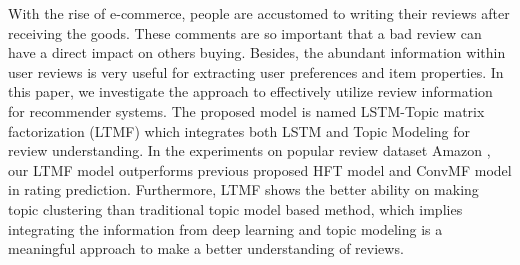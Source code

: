 With the rise of e-commerce, people are accustomed to writing their reviews after receiving the goods. These comments are so important that a bad review can have a direct impact on others buying. Besides, the abundant information within user reviews is very useful for extracting user preferences and item properties. In this paper, we investigate the approach to effectively utilize review information for recommender systems. The proposed model is named LSTM-Topic matrix factorization (LTMF) which integrates both LSTM and Topic Modeling for review understanding. In the experiments on popular review dataset Amazon , our LTMF model outperforms previous proposed HFT model and ConvMF model in rating prediction. Furthermore, LTMF shows the better ability on making topic clustering than traditional topic model based method, which implies integrating the information from deep learning and topic modeling is a meaningful approach to make a better understanding of reviews.
